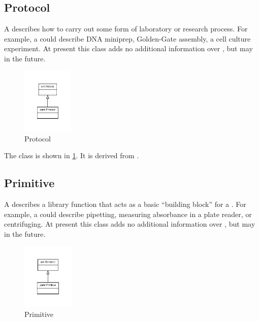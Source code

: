 %
\normalsize%
\subsection{Protocol}%
\label{sec:paml:Protocol}%
A  describes how to carry out some form of laboratory or research process.
              For example, a  could describe DNA miniprep, Golden-Gate assembly, a cell culture experiment.
              At present this class adds no additional information over , but may in the future.%
\newline%
\linebreak%


\begin{figure}[h!]%
\centering%
\includegraphics[width=0.21595744680851064\textwidth]{paml_classes/Protocol_abstraction_hierarchy.pdf}%
\caption{Protocol}%
\label{fig:Protocol}%
\end{figure}

%
The  class is shown in \ref{fig:Protocol}. It is derived from .%
%
\subsection{Primitive}%
\label{sec:paml:Primitive}%
A  describes a library function that acts as a basic ``building block'' for a .
              For example, a  could describe pipetting, measuring absorbance in a plate reader, or centrifuging.
              At present this class adds no additional information over , but may in the future.%
\newline%
\linebreak%


\begin{figure}[h!]%
\centering%
\includegraphics[width=0.21893617021276596\textwidth]{paml_classes/Primitive_abstraction_hierarchy.pdf}%
\caption{Primitive}%
\label{fig:Primitive}%
\end{figure}

